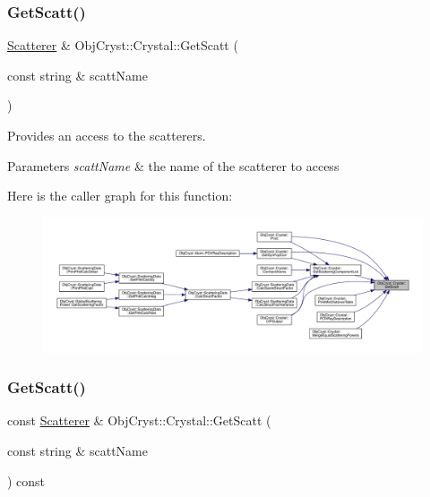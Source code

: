 \subsubsection{\texorpdfstring{GetScatt()}{GetScatt()}\hspace{0.1cm}{\footnotesize\ttfamily [1/4]}}
{\footnotesize\ttfamily \mbox{\hyperlink{class_obj_cryst_1_1_scatterer}{Scatterer}} \& Obj\+Cryst\+::\+Crystal\+::\+Get\+Scatt (\begin{DoxyParamCaption}\item[{const string \&}]{scatt\+Name }\end{DoxyParamCaption})}



Provides an access to the scatterers. 


\begin{DoxyParams}{Parameters}
{\em scatt\+Name} & the name of the scatterer to access \\
\hline
\end{DoxyParams}
Here is the caller graph for this function\+:
\nopagebreak
\begin{figure}[H]
\begin{center}
\leavevmode
\includegraphics[width=350pt]{class_obj_cryst_1_1_crystal_ab991f8f3cc005760f939f7d41694cfdf_icgraph}
\end{center}
\end{figure}
\mbox{\label{class_obj_cryst_1_1_crystal_a40a80c90631116e808b613f97092b659}} 
\subsubsection{\texorpdfstring{GetScatt()}{GetScatt()}\hspace{0.1cm}{\footnotesize\ttfamily [2/4]}}
{\footnotesize\ttfamily const \mbox{\hyperlink{class_obj_cryst_1_1_scatterer}{Scatterer}} \& Obj\+Cryst\+::\+Crystal\+::\+Get\+Scatt (\begin{DoxyParamCaption}\item[{const string \&}]{scatt\+Name }\end{DoxyParamCaption}) const}



